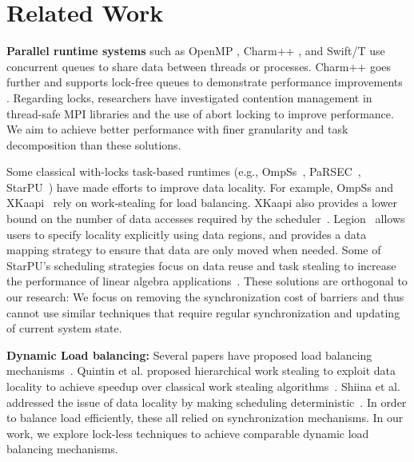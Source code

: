\section{Related Work}
\label{sec:related-work}

\textbf{Parallel runtime systems} 
such as OpenMP \cite{miscname4}, Charm++ \cite{kale1993charm}, and Swift/T \cite{wozniak2013swift} use concurrent queues to share data between threads or processes.
Charm++ goes further and supports lock-free queues to demonstrate performance improvements \cite{10.1145/1838574.1838586}.
Regarding locks, researchers have investigated contention management in thread-safe MPI libraries \cite{10.1145/3275443} and the use of abort locking \cite{10.1145/3155284.3018768} to improve performance.
We aim to achieve better performance with finer granularity and task decomposition than these solutions.

Some classical with-locks task-based runtimes (e.g., OmpSs~\cite{ompss12}, PaRSEC~\cite{parsec}, StarPU~\cite{starpu}) have made efforts to improve data locality. 
For example, OmpSs and XKaapi~\cite{xkaapi15} rely on work-stealing for load balancing.
XKaapi also provides a lower bound on the number of data accesses required by the scheduler~\cite{workstealing_locality02}.
Legion~\cite{legion_overview_dup} allows users to specify locality explicitly using data regions, and provides a data mapping strategy to ensure that data are only moved when needed.
Some of StarPU's scheduling strategies focus on data reuse and task stealing to increase the performance of linear algebra applications~\cite{gonthier-ipdps, gonthier:hal-03290998}.
These solutions are orthogonal to our research: We focus on removing the synchronization cost of barriers and thus cannot use similar techniques that require regular synchronization and updating of current system state.

\textbf{Dynamic Load balancing:}
Several papers have proposed load
balancing mechanisms~\cite{10.1145/1654059.1654113, guo2009work}.
Quintin et al. proposed hierarchical work stealing to exploit data
locality to achieve speedup over classical work stealing algorithms~\cite{10.1007/978-3-642-15277-1_21}. 
Shiina et al. addressed the issue of data locality by making scheduling deterministic~\cite{10.1145/3295500.3356161}.
In order to balance load efficiently, these all relied on synchronization mechanisms.
In our work, we explore lock-less techniques to achieve comparable dynamic load balancing mechanisms.

